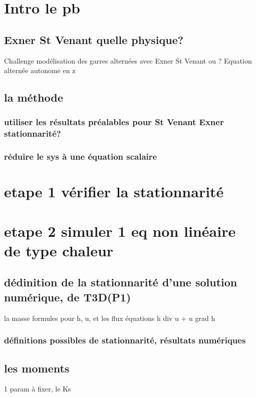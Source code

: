 \documentclass[a4paper,10pt]{article}
\begin{document}
  
  
  
  \section{Intro le pb}
  \subsection{Exner St Venant quelle physique?}
  Challenge modélisation des garres alternées avec Exner St Venant ou ?
  Equation alternée autonome en z
  \subsection{la méthode}
  \subsubsection{utiliser les résultats préalables pour St Venant Exner stationnarité?}
  \subsubsection{réduire le sys à une équation scalaire}
  \section{etape 1 vérifier la stationnarité}
  \section{etape 2 simuler 1 eq non linéaire de type chaleur}
  \subsection{dédinition de la stationnarité d'une solution numérique, de T3D(P1)}
  la masse
  formules pour h, u, et les flux
  équations h div u + u grad h
  \subsubsection{définitions possibles de stationnarité, résultats numériques}
  \subsection{les moments}
  1 param à fixer, le Ks

  
\end{document}
